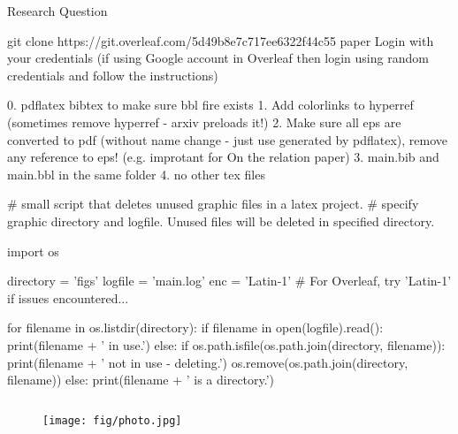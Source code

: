 \begin{frame}{Research Question}

git clone https://git.overleaf.com/5d49b8e7c717ee6322f44c55 paper
Login with your credentials (if using Google account in Overleaf then login using random credentials and follow the instructions)


0. pdflatex bibtex to make sure bbl fire exists
1. Add colorlinks to hyperref (sometimes remove hyperref - arxiv preloads it!)
2. Make sure all eps are converted to pdf (without name change - just use generated by pdflatex), remove any
reference to eps! (e.g. improtant for On the relation paper)
3. main.bib and main.bbl in the same folder
4. no other tex files 

\hypersetup{
  colorlinks = true,
  citecolor  = darkblue,
  linkcolor  = darkblue,
  citecolor  = darkblue,
  filecolor  = darkblue,
  urlcolor   = darkblue,
}
\usepackage{color}


# small script that deletes unused graphic files in a latex project.
# specify graphic directory and logfile. Unused files will be deleted in specified directory.

import os

directory = 'figs'
logfile = 'main.log'
enc = 'Latin-1' # For Overleaf, try 'Latin-1' if issues encountered...

for filename in os.listdir(directory):
    if filename in open(logfile).read():
        print(filename + ' in use.')
    else:
        if os.path.isfile(os.path.join(directory, filename)):
            print(filename + ' not in use - deleting.')
            os.remove(os.path.join(directory, filename))
        else:
            print(filename + ' is a directory.')





\begin{columns}[T] %
\begin{column}{.25\textwidth}
\begin{figure}
 \texttt{[image: fig/photo.jpg]}
 \end{figure}
\end{column}%
\hfill
\begin{column}{.48\textwidth}


\end{column}
\end{columns}
\end{frame}
